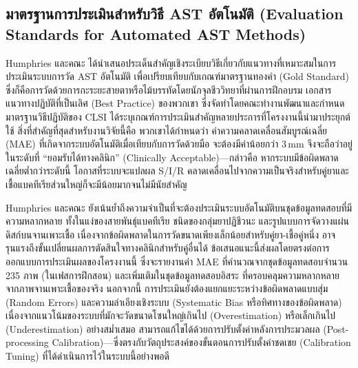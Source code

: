 \subsection{มาตรฐานการประเมินสำหรับวิธี AST อัตโนมัติ (Evaluation Standards for Automated AST Methods)}

Humphries และคณะ \cite{humphries2018} ได้นำเสนอประเด็นสำคัญเชิงระเบียบวิธีเกี่ยวกับแนวทางที่เหมาะสมในการประเมินระบบการวัด AST อัตโนมัติ เพื่อเปรียบเทียบกับเกณฑ์มาตรฐานทองคำ (Gold Standard) ซึ่งก็คือการวัดด้วยการกะระยะสายตาหรือไม้บรรทัดโดยนักจุลชีววิทยาที่ผ่านการฝึกอบรม เอกสารแนวทางปฏิบัติที่เป็นเลิศ (Best Practice) ของพวกเขา ซึ่งจัดทำโดยคณะทำงานพัฒนาและกำหนดมาตรฐานวิธีปฏิบัติของ CLSI ได้ระบุเกณฑ์การประเมินสำคัญหลายประการที่โครงงานนี้นำมาประยุกต์ใช้ สิ่งที่สำคัญที่สุดสำหรับงานวิจัยนี้คือ พวกเขาได้กำหนดว่า ค่าความคลาดเคลื่อนสัมบูรณ์เฉลี่ย (MAE) ที่เกิดจากระบบอัตโนมัติเมื่อเทียบกับการวัดด้วยมือ จะต้องมีค่าน้อยกว่า 3\,mm จึงจะถือว่าอยู่ในระดับที่ ``ยอมรับได้ทางคลินิก'' (Clinically Acceptable)---กล่าวคือ หากระบบมีข้อผิดพลาดเฉลี่ยต่ำกว่าระดับนี้ โอกาสที่ระบบจะแปลผล S/I/R คลาดเคลื่อนไปจากความเป็นจริงสำหรับคู่ยาและเชื้อแบคทีเรียส่วนใหญ่ก็จะมีน้อยมากจนไม่มีนัยสำคัญ

Humphries และคณะ ยังเน้นย้ำถึงความจำเป็นที่จะต้องประเมินระบบอัตโนมัติบนชุดข้อมูลทดสอบที่มีความหลากหลาย ทั้งในแง่ของสายพันธุ์แบคทีเรีย ชนิดของกลุ่มยาปฏิชีวนะ และรูปแบบการจัดวางแผ่นดิสก์บนจานเพาะเชื้อ เนื่องจากข้อผิดพลาดในการวัดขนาดเพียงเล็กน้อยสำหรับคู่ยา-เชื้อคู่หนึ่ง อาจรุนแรงถึงขั้นเปลี่ยนผลการตัดสินใจทางคลินิกสำหรับคู่อื่นได้ \cite{humphries2018} ข้อเสนอแนะนี้ส่งผลโดยตรงต่อการออกแบบการประเมินผลของโครงงานนี้ ซึ่งจะรายงานค่า MAE ที่คำนวณจากชุดข้อมูลทดสอบจำนวน 235 ภาพ (ในเฟสการฝึกสอน) และเพิ่มเติมในชุดข้อมูลทดสอบอิสระ ที่ครอบคลุมความหลากหลายจากภาพจานเพาะเชื้อของจริง นอกจากนี้ การประเมินยังต้องแยกแยะระหว่างข้อผิดพลาดแบบสุ่ม (Random Errors) และความลำเอียงเชิงระบบ (Systematic Bias หรือทิศทางของข้อผิดพลาด) เนื่องจากแนวโน้มของระบบที่มักจะวัดขนาดโซนใหญ่เกินไป (Overestimation) หรือเล็กเกินไป (Underestimation) อย่างสม่ำเสมอ สามารถแก้ไขได้ด้วยการปรับตั้งค่าหลังการประมวลผล (Post-processing Calibration)---ซึ่งตรงกับวัตถุประสงค์ของขั้นตอนการปรับตั้งค่าชดเชย (Calibration Tuning) ที่ได้ดำเนินการไว้ในระบบนี้อย่างพอดี
